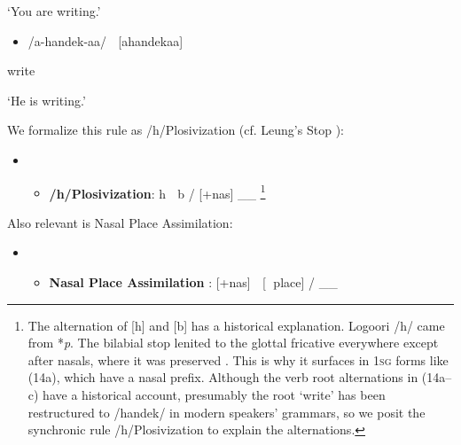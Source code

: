 \documentclass[output=paper]{langsci/langscibook}
\begin{document}
\begin{styleListParagraph}
\textsc{‘}You are writing.’
\end{styleListParagraph}

\begin{itemize}
\item \begin{styleListParagraph}
/a-handek-aa/    [ahandekaa]
\end{styleListParagraph}
\end{itemize}
\begin{styleListParagraph}
write
\end{styleListParagraph}

\begin{styleListParagraph}
\textsc{‘}He is writing.’
\end{styleListParagraph}

We formalize this rule as /h/Plosivization (cf. Leung’s Stop \citet[117]{Formation1991}):

\setcounter{itemize}{0}
\begin{itemize}
\item \setcounter{itemize}{0}
\begin{itemize}
\item \begin{styleListParagraph}
\textbf{/h/Plosivization}: h  b / [+nas] \_\_ \footnote{   The alternation of [h] and [b] has a historical explanation. Logoori /h/ came from *\textit{p}. The bilabial stop lenited to the glottal fricative everywhere except after nasals, where it was preserved \citep{Hyman2003}. This is why it surfaces in 1\textsc{sg} forms like (14a), which have a nasal prefix. Although the verb root alternations in (14a–c) have a historical account, presumably the root ‘write’ has been restructured to /handek/ in modern speakers’ grammars, so we posit the synchronic rule /h/Plosivization to explain the alternations.}
\end{styleListParagraph}
\end{itemize}
\end{itemize}

Also relevant is Nasal Place Assimilation:

\begin{itemize}
\item \setcounter{itemize}{0}
\begin{itemize}
\item \begin{styleListParagraph}
\textbf{Nasal Place Assimilation }\citep[116]{Leung1991}: [+nas]  [ place] / \_\_ 
\end{styleListParagraph}
\end{itemize}
\end{itemize}
\end{document}
